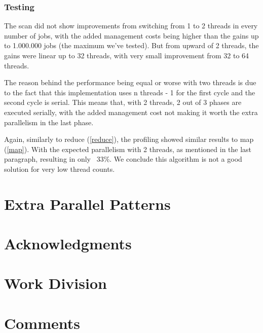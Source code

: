 \documentclass[9pt,journal]{IEEEtran}
\begin{document}
\subsubsection{Testing}

The scan did not show improvements from switching from 1 to 2 threads in every number of jobs, with the added management costs being higher than the gains up to 1.000.000 jobs (the maximum we've tested). But from upward of 2 threads, the gains were linear up to 32 threads, with very small improvement from 32 to 64 threads. 

The reason behind the performance being equal or worse with two threads is due to the fact that this implementation uses n threads - 1 for the first cycle and the second cycle is serial. This means that, with 2 threads, 2 out of 3 phases are executed serially, with the added management cost not making it worth the extra parallelism in the last phase.

Again, similarly to reduce (\ref{reduce}), the profiling showed similar results to map (\ref{map}). With the expected parallelism with 2 threads, as mentioned in the last paragraph, resulting in only ~33\%. We conclude this algorithm is not a good solution for very low thread counts.

\section{Extra Parallel Patterns}

\section{Acknowledgments}


{}

\section{Work Division}

\section{Comments}
\end{document}
